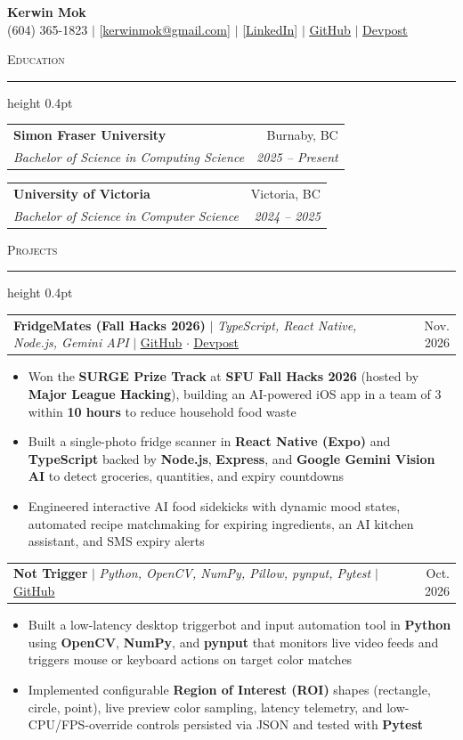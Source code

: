 \documentclass[letterpaper,11pt]{article}
\makeatletter
\newcommand{\resumesection}[1]{%
  \vspace{4pt}%
  {\large\scshape #1}\vspace{1.5pt}%
  \hrule height 0.4pt%
  \vspace{3pt}%
}
\newcommand{\resumeSubheading}[4]{%
  \vspace{1.5pt}%
  \noindent\begin{tabular*}{\textwidth}{@{\extracolsep{\fill}}l r@{}}
    \textbf{#1} & #2 \\
    \textit{\small #3} & \textit{\small #4} \\
  \end{tabular*}\vspace{-4pt}%
}
\newcommand{\resumeProjectHeading}[2]{%
  \vspace{1.5pt}%
  \noindent\begin{tabular*}{\textwidth}{@{\extracolsep{\fill}}l r@{}}
    \small #1 & \small #2 \\
  \end{tabular*}\vspace{-4pt}%
}
\newcommand{\resumeItemListStart}{%
  \begin{itemize}%
    \setlength{\itemsep}{0.5pt}%
    \setlength{\parskip}{0pt}%
    \setlength{\parsep}{0pt}%
    \setlength{\topsep}{1.5pt}%
}
\newcommand{\resumeItemListEnd}{\end{itemize}\vspace{-3pt}}
\newcommand{\resumeItem}[1]{%
  \item\small{#1}%
}
\makeatother
\begin{document}
\begin{center}
  {\Huge \textbf{Kerwin Mok}} \\ \vspace{3pt}
  \small (604) 365-1823 $|$
  [\underline{kerwinmok@gmail.com}] $|$
  [\underline{LinkedIn}] $|$
  \href{https://github.com/kerwinmok}{\underline{GitHub}} $|$
  \href{https://devpost.com/software/fridgemates}{\underline{Devpost}}
\end{center}

\resumesection{Education}

\resumeSubheading
  {Simon Fraser University}{Burnaby, BC}
  {Bachelor of Science in Computing Science}{2025 -- Present}

\resumeSubheading
  {University of Victoria}{Victoria, BC}
  {Bachelor of Science in Computer Science}{2024 -- 2025}
\vspace{1pt}

\resumesection{Projects}

\resumeProjectHeading
  {\textbf{FridgeMates (Fall Hacks 2026)} $|$ \emph{TypeScript, React Native, Node.js, Gemini API} $|$ \href{https://github.com/Rainier-Ordinario/FridgeMates}{\underline{GitHub}} $\cdot$ \href{https://devpost.com/software/fridgemates}{\underline{Devpost}}}{Nov. 2026}
\resumeItemListStart
  \resumeItem{Won the \textbf{SURGE Prize Track} at \textbf{SFU Fall Hacks 2026} (hosted by \textbf{Major League Hacking}), building an AI-powered iOS app in a team of 3 within \textbf{10 hours} to reduce household food waste}
  \resumeItem{Built a single-photo fridge scanner in \textbf{React Native (Expo)} and \textbf{TypeScript} backed by \textbf{Node.js}, \textbf{Express}, and \textbf{Google Gemini Vision AI} to detect groceries, quantities, and expiry countdowns}
  \resumeItem{Engineered interactive AI food sidekicks with dynamic mood states, automated recipe matchmaking for expiring ingredients, an AI kitchen assistant, and SMS expiry alerts}
\resumeItemListEnd

\resumeProjectHeading
  {\textbf{Not Trigger} $|$ \emph{Python, OpenCV, NumPy, Pillow, pynput, Pytest} $|$ \href{https://github.com/kerwinmok/not_trigger}{\underline{GitHub}}}{Oct. 2026}
\resumeItemListStart
  \resumeItem{Built a low-latency desktop triggerbot and input automation tool in \textbf{Python} using \textbf{OpenCV}, \textbf{NumPy}, and \textbf{pynput} that monitors live video feeds and triggers mouse or keyboard actions on target color matches}
  \resumeItem{Implemented configurable \textbf{Region of Interest (ROI)} shapes (rectangle, circle, point), live preview color sampling, latency telemetry, and low-CPU/FPS-override controls persisted via JSON and tested with \textbf{Pytest}}
\resumeItemListEnd
\end{document}
